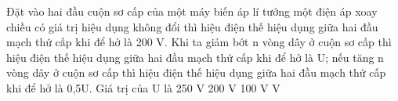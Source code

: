 \begin{vidu} %
	Đặt vào hai đầu cuộn sơ cấp của một máy biến áp lí tưởng một điện áp xoay chiều có giá trị hiệu dụng không đổi thì hiệu điện thế hiệu dụng giữa hai đầu mạch thứ cấp khi để hở là 200 V. Khi ta giảm bớt n vòng dây ở cuộn sơ cấp thì hiệu điện thế hiệu dụng giữa hai đầu mạch thứ cấp khi để hở là U; nếu tăng n vòng dây ở cuộn sơ cấp thì hiệu điện thế hiệu dụng giữa hai đầu mạch thứ cấp khi để hở là 0,5U. Giá trị của U là
	\choice
	{250 V}
	{200 V}
	{100 V}
	{ V}
\end{vidu}
